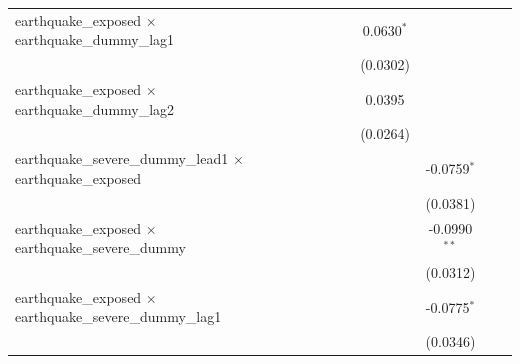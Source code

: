 \begin{tabular}{lcccccccc}
   earthquake\_exposed $\times$ earthquake\_dummy\_lag1               &                       &                       &                       &                       & 0.0630$^{*}$          &                       &                       &   \\   
                                                                      &                       &                       &                       &                       & (0.0302)              &                       &                       &   \\   
   earthquake\_exposed $\times$ earthquake\_dummy\_lag2               &                       &                       &                       &                       & 0.0395                &                       &                       &   \\   
                                                                      &                       &                       &                       &                       & (0.0264)              &                       &                       &   \\   
   earthquake\_severe\_dummy\_lead1 $\times$ earthquake\_exposed      &                       &                       &                       &                       &                       & -0.0759$^{*}$         &                       &   \\   
                                                                      &                       &                       &                       &                       &                       & (0.0381)              &                       &   \\   
   earthquake\_exposed $\times$ earthquake\_severe\_dummy             &                       &                       &                       &                       &                       & -0.0990$^{**}$        &                       &   \\   
                                                                      &                       &                       &                       &                       &                       & (0.0312)              &                       &   \\   
   earthquake\_exposed $\times$ earthquake\_severe\_dummy\_lag1       &                       &                       &                       &                       &                       & -0.0775$^{*}$         &                       &   \\   
                                                                      &                       &                       &                       &                       &                       & (0.0346)              &                       &   \\   

\end{tabular}

